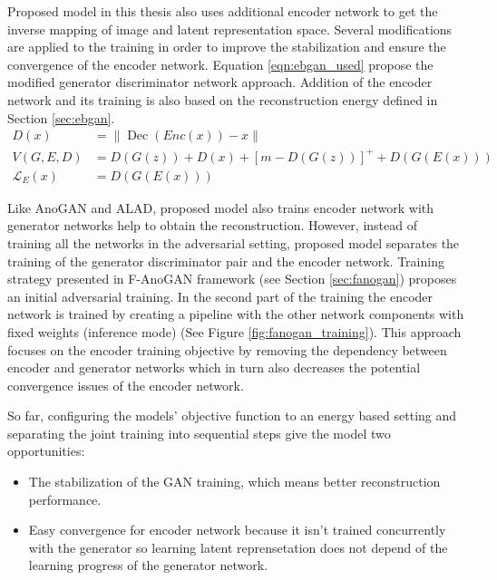Proposed model in this thesis also uses additional encoder network to get the inverse mapping
of image and latent representation space. Several modifications are applied to the training in order to improve the stabilization
and ensure the convergence of the encoder network. Equation \ref{eqn:ebgan_used} propose the modified generator
discriminator network approach. Addition of the encoder network and its training is also based on the reconstruction 
energy defined in Section \ref{sec:ebgan}.
\begin{equation}
\label{eqn:encebgan_used}
\begin{aligned}
D(x)&=\|\operatorname{Dec}(E n c(x))-x\|\\[5pt]
V(G,E, D) &= D(G(z)) + D(x)+[m-D(G(z))]^{+} + D(G(E(x))) \\[5pt]
\mathcal{L}_{E}(x) &= D(G(E(x)))
\end{aligned}
\end{equation}

Like AnoGAN and ALAD, proposed model also trains encoder network with generator networks help to
obtain the reconstruction. However, instead of training all the networks in the adversarial setting,
proposed model separates the training of the generator discriminator pair and the encoder network.
Training strategy presented in F-AnoGAN framework (see Section \ref{sec:fanogan}) proposes an
initial adversarial training. In the second part of the training the encoder network is trained by
creating a pipeline with the other network components with fixed weights (inference mode) (See
Figure \ref{fig:fanogan_training}). This approach focuses on the encoder training objective by
removing the dependency between encoder and generator networks which in turn also decreases the potential
convergence issues of the encoder network.

So far, configuring the models' objective function to an energy based setting and separating the
joint training into sequential steps give the model two opportunities:

\begin{itemize}
	\item {The stabilization of the GAN training, which means better reconstruction performance.}
	\item {Easy convergence for encoder network because it isn't trained concurrently with the
	generator so learning latent reprensetation does not depend of the learning progress of the generator network. }
\end{itemize}

